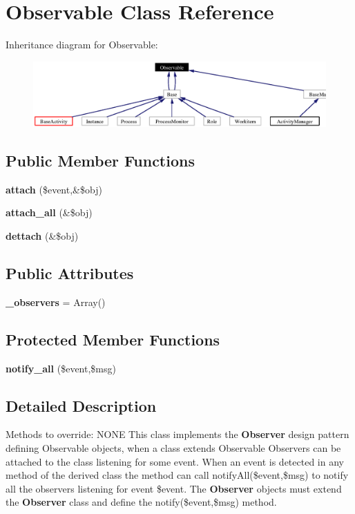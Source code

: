 \section{Observable Class Reference}
\label{classObservable}
Inheritance diagram for Observable:\begin{figure}[H]
\begin{center}
\leavevmode
\includegraphics[width=392pt]{classObservable__inherit__graph}
\end{center}
\end{figure}
\subsection*{Public Member Functions}
\begin{CompactItemize}
\item 
{\bf attach} (\$event,\&\$obj)
\item 
{\bf attach\_\-all} (\&\$obj)
\item 
{\bf dettach} (\&\$obj)
\end{CompactItemize}
\subsection*{Public Attributes}
\begin{CompactItemize}
\item 
{}
{\bf \_\-observers} = Array()\label{classObservable_m0}

\end{CompactItemize}
\subsection*{Protected Member Functions}
\begin{CompactItemize}
\item 
{\bf notify\_\-all} (\$event,\$msg)
\end{CompactItemize}


\subsection{Detailed Description}
Methods to override: NONE This class implements the {\bf Observer} design pattern defining Observable objects, when a class extends Observable Observers can be attached to the class listening for some event. When an event is detected in any method of the derived class the method can call notify\-All(\$event,\$msg) to notify all the observers listening for event \$event. The {\bf Observer} objects must extend the {\bf Observer} class and define the notify(\$event,\$msg) method. 



